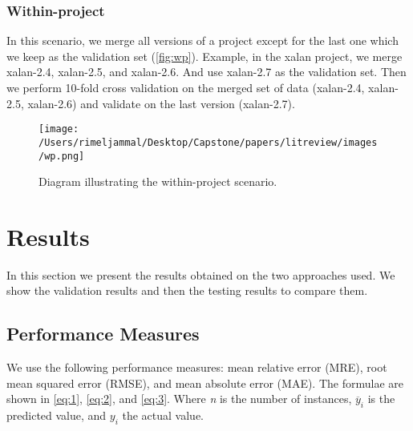 \documentclass[]{article}
\begin{document}
	\subsubsection{Within-project}
	In this scenario, we merge all versions of a project except for the last one which we keep as the validation set (\autoref{fig:wp}). Example, in the xalan project, we merge xalan-2.4, xalan-2.5, and xalan-2.6. And use xalan-2.7 as the validation set. Then we perform 10-fold cross validation on the merged set of data (xalan-2.4, xalan-2.5, xalan-2.6) and validate on the last version (xalan-2.7).\\
	
	\FloatBarrier
	\begin{figure}[h]
		\centerline{\texttt{[image: /Users/rimeljammal/Desktop/Capstone/papers/litreview/images/wp.png]}}
		\caption{Diagram illustrating the within-project scenario.}\label{fig:wp}
	\end{figure}
	\FloatBarrier
	
	\section{Results}
	
	In this section we present the results obtained on the two approaches used. We show the validation results and then the testing results to compare them.
	
	\subsection{Performance Measures}
	We use the following performance measures: mean relative error (MRE), root mean squared error (RMSE), and mean absolute error (MAE). The formulae are shown in \autoref{eq:1}, \autoref{eq:2}, and \autoref{eq:3}. Where \textit{n} is the number of instances, $\overline{y}_{i} $ is the predicted value, and ${y}_{i} $ the actual value.\\
	
\end{document}
